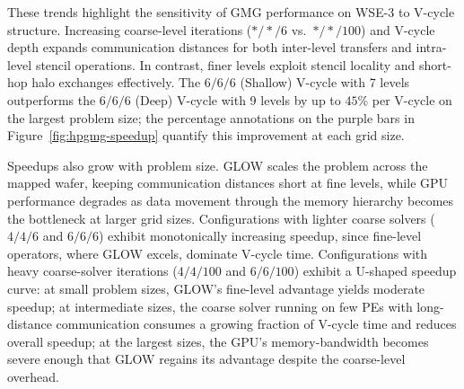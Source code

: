 \documentclass[conference]{IEEEtran}
\begin{document}
            These trends highlight the sensitivity of GMG performance on WSE-3 to V-cycle structure. Increasing coarse-level iterations ($*/*/6$ vs.\ $*/*/100$) and V-cycle depth expands communication distances for both inter-level transfers and intra-level stencil operations. In contrast, finer levels exploit stencil locality and short-hop halo exchanges effectively. The $6/6/6$ (Shallow) V-cycle with 7 levels outperforms the $6/6/6$ (Deep) V-cycle with 9 levels by up to $45\%$ per V-cycle on the largest problem size; the percentage annotations on the purple bars in Figure~\ref{fig:hpgmg-speedup} quantify this improvement at each grid size.

            Speedups also grow with problem size. GLOW scales the problem across the mapped wafer, keeping communication distances short at fine levels, while GPU performance degrades as data movement through the memory hierarchy becomes the bottleneck at larger grid sizes. Configurations with lighter coarse solvers ($4/4/6$ and $6/6/6$) exhibit monotonically increasing speedup, since fine-level operators, where GLOW excels, dominate V-cycle time. Configurations with heavy coarse-solver iterations ($4/4/100$ and $6/6/100$) exhibit a U-shaped speedup curve: at small problem sizes, GLOW's fine-level advantage yields moderate speedup; at intermediate sizes, the coarse solver running on few PEs with long-distance communication consumes a growing fraction of V-cycle time and reduces overall speedup; at the largest sizes, the GPU's memory-bandwidth becomes severe enough that GLOW regains its advantage despite the coarse-level overhead.
\end{document}
